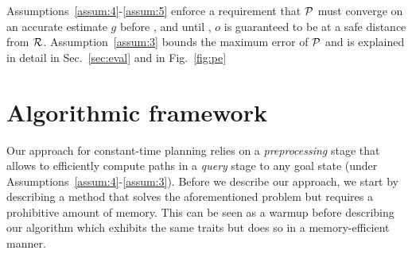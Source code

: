 \documentclass[conference]{IEEEtran}
\begin{document}
Assumptions~\ref{assum:4}-\ref{assum:5} enforce a requirement that $\mathcal{P}$ must converge on an accurate estimate $g$ before \Trc, and until \Trc, $o$ is guaranteed to be at a safe distance from $\mathcal{R}$.
%
Assumption~\ref{assum:3} bounds the maximum error of $\mathcal{P}$ and is explained in detail in Sec.~\ref{sec:eval} and in Fig.~\ref{fig:pe}




\section{Algorithmic framework}
\label{subsec:strawman}
Our approach for constant-time planning relies on a \emph{preprocessing} stage that allows to efficiently compute paths in a \emph{query} stage to any goal state (under Assumptions~\ref{assum:4}-\ref{assum:3}). 
%
Before we describe our approach, we start by describing a \naive method that solves the aforementioned problem but requires a prohibitive amount of memory.
%
This can be seen as a warmup before describing our algorithm which exhibits the same traits but does so in a memory-efficient manner.
\end{document}
